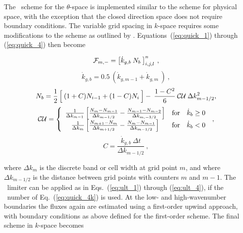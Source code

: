 \vspace{\baselineskip} \noindent
The \uq\ scheme for the $\theta$-space is implemented similar to the scheme
for physical space, with the exception that the closed direction space does
not require boundary conditions. The variable grid spacing in $k$-space
requires some modifications to the scheme as outlined by
\cite[{Appendix}]{art:Leo79}. Equations~(\ref{eq:quick_1}) through
(\ref{eq:quick_4}) then become


\begin{equation}
{\cal F}_{m,-} = \left [ \dot{k}_{g,b} \: N_b \: \right ]^n_{i,j,l}
\: , \label{eq:quick_1k}\end{equation} \begin{equation}
\dot{k}_{g,b} = 0.5 \: \left ( \dot{k}_{g,m-1} + \dot{k}_{g,m} 
\: \right )  \: , \label{eq:quick_1ak}
\end{equation} \begin{equation}
N_b = \frac{1}{2} \left [ \rule[0mm]{0mm}{\baselineskip} \: 
(1+C)N_{i-1} + (1-C)N_i \: \right ] - \:
\frac{1-C^2}{6} \: {\cal CU} \: \Delta k^2_{m-1/2}, \label{eq:quick_2k} \end{equation} \begin{equation}
{\cal CU} =  \left \{ \begin{array}{ccc}
\frac{1}{\Delta k_{m-1}}
\left [ \frac{N_{ m }-N_{m-1}}{\Delta k_{m-1/2}} - 
        \frac{N_{m-1}-N_{m-2}}{\Delta k_{m,-3/2}} \right ]
               & \mbox{for} & \dot{k}_b \geq 0 \\
\frac{1}{\Delta k_m}
\left [ \frac{N_{m+1}-N_{ m }}{\Delta k_{m+1/2}} -
       \frac{N_{ m }-N_{m-1}}{\Delta k_{m-1/2}} \right ]
               & \mbox{for} & \dot{k}_b   <  0
\end{array} \right . \: , \label{eq:quick_3k}
\end{equation} \begin{equation}
C = \frac{\dot{k}_{g,b} \: \Delta t}{\Delta k_{m-1/2}}
\: , \label{eq:quick_4k} \end{equation}

\noindent
where $\Delta k_m$ is the discrete band or cell width at grid point $m$, and
where $\Delta k_{m-1/2}$ is the distance between grid points with counters $m$
and $m-1$. The \ult\ limiter can be applied as in Eqs.~(\ref{eq:ult_1})
through (\ref{eq:ult_4}), if the \cfl\ number of Eq.~(\ref{eq:quick_4k}) is
used. At the low- and high-wavenumber boundaries the fluxes again are
estimated using a first-order upwind approach, with boundary conditions as
above defined for the first-order scheme. The final scheme in $k$-space
becomes

